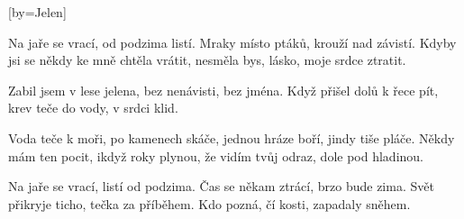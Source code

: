 [by={Jelen}]

\beginverse{}
Na jaře se vrací, od podzima listí.
Mraky místo ptáků, krouží nad závistí.
Kdyby jsi se někdy ke mně chtěla vrátit,
nesměla bys, lásko, moje srdce ztratit.
\endverse{}

\beginchorus{}
Zabil jsem v lese jelena,
bez nenávisti, bez jména.
Když přišel dolů k řece pít,
krev teče do vody, v srdci klid.
\endchorus{}

\beginverse{}
Voda teče k moři, po kamenech skáče,
jednou hráze boří, jindy tiše pláče.
Někdy mám ten pocit, ikdyž roky plynou,
že vidím tvůj odraz, dole pod hladinou.
\endverse{}

\beginchorus{}
\phantom{}
\endchorus{}

\beginverse{}
Na jaře se vrací, listí od podzima.
Čas se někam ztrácí, brzo bude zima.
Svět přikryje ticho, tečka za příběhem.
Kdo pozná, čí kosti, zapadaly sněhem.
\endverse{}

\beginchorus{}
\phantom{}
\endchorus{}

\endsong{}
